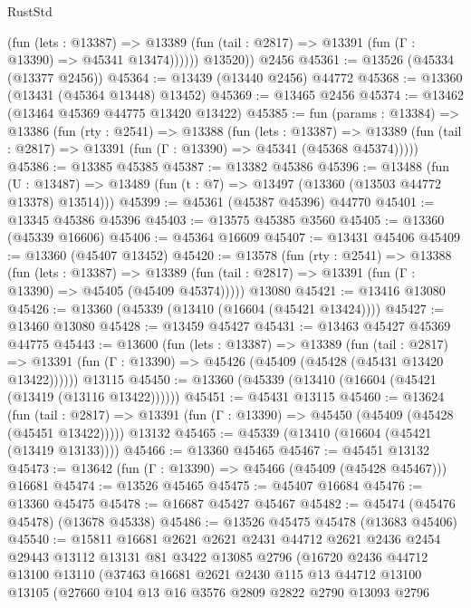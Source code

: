 \begin{lexlean}{RustStd}
\begin{coremodule}
              (fun (lets : @13387) =>
              @13389 (fun (tail : @2817) => @13391 (fun (Γ : @13390) => @45341 @13474))))))
        @13520))
    @2456
@45361 := @13526 (@45334 (@13377 @2456))
@45364 := @13439 (@13440 @2456) @44772
@45368 := @13360 (@13431 (@45364 @13448) @13452)
@45369 := @13465 @2456
@45374 := @13462 (@13464 @45369 @44775 @13420 @13422)
@45385 := fun (params : @13384) =>
  @13386
    (fun (rty : @2541) =>
    @13388
      (fun (lets : @13387) =>
      @13389 (fun (tail : @2817) => @13391 (fun (Γ : @13390) => @45341 (@45368 @45374)))))
@45386 := @13385 @45385
@45387 := @13382 @45386
@45396 := @13488
    (fun (U : @13487) => @13489 (fun (t : @7) => @13497 (@13360 (@13503 @44772 @13378) @13514)))
@45399 := @45361 (@45387 @45396) @44770
@45401 := @13345 @45386 @45396
@45403 := @13575 @45385 @3560
@45405 := @13360 (@45339 @16606)
@45406 := @45364 @16609
@45407 := @13431 @45406
@45409 := @13360 (@45407 @13452)
@45420 := @13578
    (fun (rty : @2541) =>
    @13388
      (fun (lets : @13387) =>
      @13389 (fun (tail : @2817) => @13391 (fun (Γ : @13390) => @45405 (@45409 @45374)))))
    @13080
@45421 := @13416 @13080
@45426 := @13360 (@45339 (@13410 (@16604 (@45421 @13424))))
@45427 := @13460 @13080
@45428 := @13459 @45427
@45431 := @13463 @45427 @45369 @44775
@45443 := @13600
    (fun (lets : @13387) =>
    @13389
      (fun (tail : @2817) =>
      @13391 (fun (Γ : @13390) => @45426 (@45409 (@45428 (@45431 @13420 @13422))))))
    @13115
@45450 := @13360 (@45339 (@13410 (@16604 (@45421 (@13419 (@13116 @13422))))))
@45451 := @45431 @13115
@45460 := @13624
    (fun (tail : @2817) => @13391 (fun (Γ : @13390) => @45450 (@45409 (@45428 (@45451 @13422)))))
    @13132
@45465 := @45339 (@13410 (@16604 (@45421 (@13419 @13133))))
@45466 := @13360 @45465
@45467 := @45451 @13132
@45473 := @13642 (fun (Γ : @13390) => @45466 (@45409 (@45428 @45467))) @16681
@45474 := @13526 @45465
@45475 := @45407 @16684
@45476 := @13360 @45475
@45478 := @16687 @45427 @45467
@45482 := @45474 (@45476 @45478) (@13678 @45338)
@45486 := @13526 @45475 @45478 (@13683 @45406)
@45540 := @15811
    @16681
    @2621
    @2621
    @2431
    @44712
    @2621
    @2436
    @2454
    @29443
    @13112
    @13131
    @81
    @3422
    @13085
    @2796
    (@16720
      @2436
      @44712
      @13100
      @13110
      (@37463
        @16681
        @2621
        @2430
        @115
        @13
        @44712
        @13100
        @13105
        (@27660
          @104
          @13
          @16
          @3576
          @2809
          @2822
          @2790
          @13093
          @2796

\end{coremodule}
\end{lexlean}
